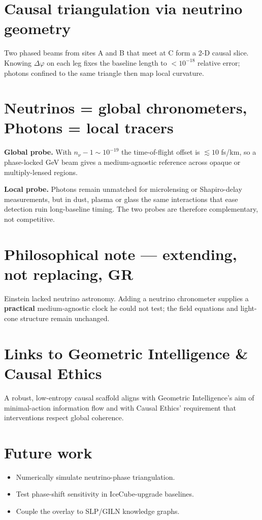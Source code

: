 \documentclass[12pt]{article}
\begin{document}
\section{Causal triangulation via neutrino geometry}
Two phased beams from sites A and B that meet at C form a 2-D causal slice. Knowing $\Delta \varphi$ on each leg fixes the baseline length to $< 10^{-18}$ relative error; photons confined to the same triangle then map local curvature.

\section{Neutrinos = global chronometers, Photons = local tracers}
\textbf{Global probe.} With $n_\nu - 1 \sim 10^{-19}$ the time-of-flight offset is $\lesssim 10$ fs/km, so a phase-locked GeV beam gives a medium-agnostic reference across opaque or multiply-lensed regions.

\textbf{Local probe.} Photons remain unmatched for microlensing or Shapiro-delay measurements, but in dust, plasma or glass the same interactions that ease detection ruin long-baseline timing. The two probes are therefore complementary, not competitive.

\section{Philosophical note — extending, not replacing, GR}
Einstein lacked neutrino astronomy. Adding a neutrino chronometer supplies a \textbf{practical} medium-agnostic clock he could not test; the field equations and light-cone structure remain unchanged.

\section{Links to Geometric Intelligence \& Causal Ethics}
A robust, low-entropy causal scaffold aligns with Geometric Intelligence’s aim of minimal-action information flow and with Causal Ethics’ requirement that interventions respect global coherence.

\section{Future work}
\begin{itemize}
\item Numerically simulate neutrino-phase triangulation.
\item Test phase-shift sensitivity in IceCube-upgrade baselines.
\item Couple the overlay to SLP/GILN knowledge graphs.
\end{itemize}
\end{document}
